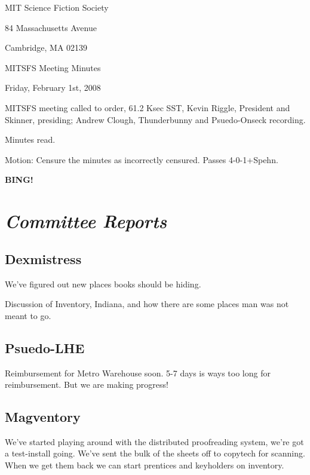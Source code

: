 \documentclass[10pt]{article}
\newcommand{\bing}{{\bf BING!} }
\newcommand{\goto}[1]{\bing \vskip 12pt \section*{{\em{#1}}}}
\begin{document}
\begin{center}

MIT Science Fiction Society

84 Massachusetts Avenue

Cambridge, MA 02139

\vspace{12pt}

MITSFS Meeting Minutes

Friday, February 1st, 2008

\end{center}

\vspace{18pt}

\setlength{\parskip}{6pt}

\noindent
MITSFS meeting called to order, 61.2 Ksec SST,
Kevin Riggle, President and Skinner, presiding; Andrew Clough, Thunderbunny and Psuedo-Onseck recording.

Minutes read.

Motion:  Censure the minutes as incorrectly censured.  Passes 4-0-1+Spehn.

\BING

\goto{Committee Reports}

\subsection*{Dexmistress}

We've figured out new places books should be hiding.

Discussion of Inventory, Indiana, and how there are some places man was not meant to go.

\subsection*{Psuedo-LHE}

Reimbursement for Metro Warehouse soon.  5-7 days is ways too long for reimbursement.  But we are making progress!

\subsection*{Magventory}

We've started playing around with the distributed proofreading system, we're got a test-install going.  We've sent the bulk of the sheets off to copytech for scanning.  When we get them back we can start prentices and keyholders on inventory.
\end{document}
